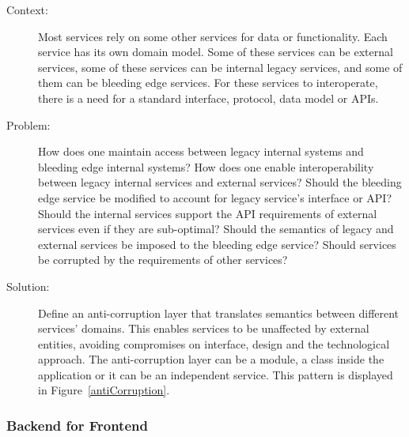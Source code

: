 \documentclass{bmcart}
\begin{document}
\begin{description}
  \item[Context:] Most services rely on some other services for data or functionality. Each service has its own domain model. Some of these services can be external services, some of these services can be internal legacy services, and some of them can be bleeding edge services. For these services to interoperate, there is a need for a standard interface, protocol, data model or APIs.  
  \item[Problem:] How does one maintain access between legacy internal systems and bleeding edge internal systems? How does one enable interoperability between legacy internal services and external services? Should the bleeding edge service be modified to account for legacy service's interface or API? Should the internal services support the API requirements of external services even if they are sub-optimal? Should the semantics of legacy and external services be imposed to the bleeding edge service? Should services be corrupted by the requirements of other services?  
  \item[Solution:] Define an anti-corruption layer that translates semantics between different services' domains. This enables services to be unaffected by external entities, avoiding compromises on interface, design and the technological approach. The anti-corruption layer can be a module, a class inside the application or it can be an independent service. This pattern is displayed in Figure~\ref{antiCorruption}.    
\end{description}



\subsubsection{Backend for Frontend}
\end{document}
